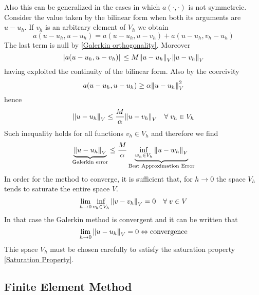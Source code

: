 Also this can be generalized in the cases in which \(a(\cdot, \cdot)\) is not symmetrcic. Consider the value taken by the bilinear form when both its arguments are \(u-u_h\). If \(v_h\) is an arbitrary element of \(V_h\) we obtain 
\[
    a(u-u_h, u-u_h) = a(u-u_h, u-v_h) + a(u-u_h, v_h-u_h)
\]
The last term is null by \eqref{Galerkin orthogonality}. Moreover 
\[
    \abs*{a(u-u_h, u-v_h)} \leq M \norm{u-u_h}_V\norm{u-v_h}_V
\]
having exploited the continuity of the bilinear form. Also by the coercivity 
\[
    a(u-u_h, u-u_h) \geq \alpha \norm{u-u_h}^2_V
\]
hence 
\[
    \norm{u-u_h}_V \leq \frac{M}{\alpha} \norm{u-v_h}_V \quad \forall\; v_h \in V_h
\]
Such inequality holds for all functions \(v_h \in V_h\) and therefore we find 
\begin{equation}
   \underbrace{ \norm{u-u_h}_V}_{\text{Galerkin error}} \leq \frac{M}{\alpha} \underbrace{\inf_{w_h \in V_h} \norm{u - w_h}_V}_{\text{Best Approximation Error}} \label{Ceà Lemma}
\end{equation}
In order for the method to converge, it is sufficient that, for \(h \to 0\) the space \(V_h\) tends to saturate the entire space \(V\). 
\begin{equation}
    \lim_{h \to 0} \inf_{v_h \in V_h} \norm{v-v_h}_V= 0 \quad \forall \; v \in V \label{Saturation Property}
\end{equation}
In that case the Galerkin method is convergent and it can be written that
\[
    \lim_{h\to 0} \norm{u-u_h}_V = 0 \Leftrightarrow \text{convergence}
\]
Thie space \(V_h\) must be chosen carefully to satisfy the saturation property \eqref{Saturation Property}.
\subsection{Finite Element Method}
